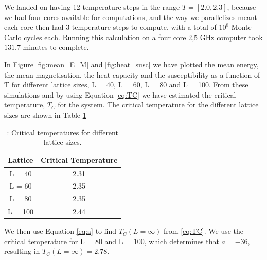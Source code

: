 \documentclass{article}
\begin{document}
{{		We landed on having 12 temperature steps in the range $T = [2.0, 2.3]$, because we had four cores available for computations, and the way we parallelizes meant each core then had 3 temperature steps to compute, with a total of $10^8$ Monte Carlo cycles each. Running this calculation on a four core 2,5 GHz computer took $131.7$ minutes to complete.

		In Figure \ref{fig:mean_E_M} and \ref{fig:heat_susc} we have plotted the mean energy, the mean magnetisation, the heat capacity and the susceptibility as a function of T for different lattice sizes, L = 40, L = 60, L = 80 and L = 100. From these simulations and by using Equation \ref{eq:TC} we have estimated the critical temperature, $T_C$ for the system. The critical temperature for the different lattice sizes are shown in Table \ref{Tab:TC}

		{\renewcommand{\arraystretch}{1.5}
		\begin{table}[h!]
			\caption{: Critical temperatures for different lattice sizes.}
				\label{Tab:TC}
				\centering
			\begin{tabular}{c c}
					Lattice & Critical Temperature\\
					\hline
					L = 40 & 2.31 \\
					L = 60 & 2.35 \\
					L = 80 & 2.35 \\
					L = 100	& 2.44 \\
				\hline
			\end{tabular}
		\end{table}

		We then use Equation \ref{eq:a} to find $T_C(L=\infty)$ from \ref{eq:TC}. We use the critical temperature for L = 80 and L = 100, which determines that $a = -36$, resulting in $T_C(L=\infty) = 2.78$.


}}}
\end{document}

